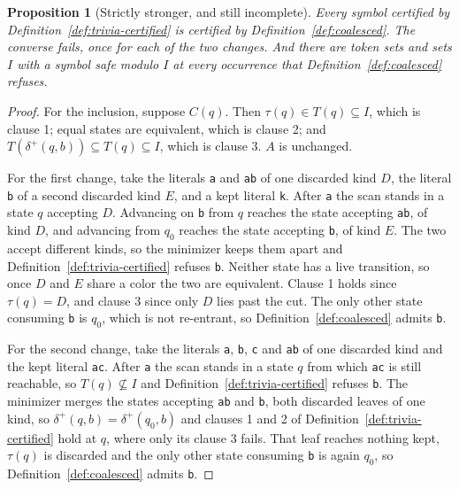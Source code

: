 \documentclass[11pt,a4paper]{article}
\theoremstyle{definition}
\theoremstyle{plain}
\newtheorem{proposition}{Proposition}
\newcommand{\code}[1]{\texttt{#1}}
\begin{document}
\begin{proposition}[Strictly stronger, and still incomplete]
\label{prop:coalesced-strict}
Every symbol certified by Definition~\ref{def:trivia-certified} is certified by Definition~\ref{def:coalesced}. The
converse fails, once for each of the two changes. And there are token sets and sets $I$ with a symbol safe modulo $I$ at
every occurrence that Definition~\ref{def:coalesced} refuses.
\end{proposition}

\begin{proof}
For the inclusion, suppose $C(q)$. Then $\tau(q) \in T(q) \subseteq I$, which is clause 1; equal states are equivalent,
which is clause 2; and $T(\delta^+(q, b)) \subseteq T(q) \subseteq I$, which is clause 3. $A$ is unchanged.

For the first change, take the literals \code{a} and \code{ab} of one discarded kind $D$, the literal \code{b} of a
second discarded kind $E$, and a kept literal \code{k}. After \code{a} the scan stands in a state $q$ accepting $D$.
Advancing on \code{b} from $q$ reaches the state accepting \code{ab}, of kind $D$, and advancing from $q_0$ reaches the
state accepting \code{b}, of kind $E$. The two accept different kinds, so the minimizer keeps them apart and
Definition~\ref{def:trivia-certified} refuses \code{b}. Neither state has a live transition, so once $D$ and $E$ share a
color the two are equivalent. Clause 1 holds since $\tau(q) = D$, and clause 3 since only $D$ lies past the cut. The
only other state consuming \code{b} is $q_0$, which is not re-entrant, so Definition~\ref{def:coalesced} admits
\code{b}.

For the second change, take the literals \code{a}, \code{b}, \code{c} and \code{ab} of one discarded kind and the kept
literal \code{ac}. After \code{a} the scan stands in a state $q$ from which \code{ac} is still reachable, so
$T(q) \not\subseteq I$ and Definition~\ref{def:trivia-certified} refuses \code{b}. The minimizer merges the states
accepting \code{ab} and \code{b}, both discarded leaves of one kind, so $\delta^+(q, b) = \delta^+(q_0, b)$ and clauses
1 and 2 of Definition~\ref{def:trivia-certified} hold at $q$, where only its clause 3 fails. That leaf reaches nothing
kept, $\tau(q)$ is discarded and the only other state consuming \code{b} is again $q_0$, so
Definition~\ref{def:coalesced} admits \code{b}.


\end{proof}
\end{document}

